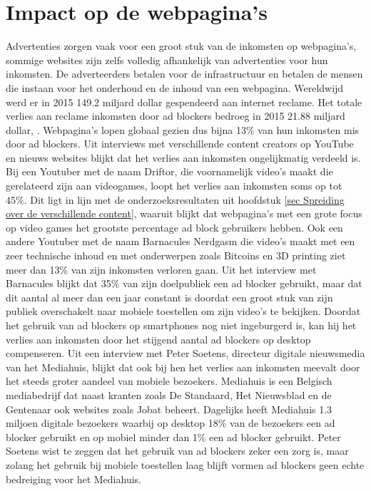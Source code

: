 \documentclass[pdftex,a4paper,12pt,twoside]{report}
\begin{document}
\section{Impact op de webpagina's}
\label{sec:Impact op de webpagina's}
Advertenties zorgen vaak voor een groot stuk van de inkomsten op webpagina's, sommige websites zijn zelfs volledig afhankelijk van advertenties voor hun inkomsten. De adverteerders betalen voor de infrastructuur en betalen de mensen die instaan voor het onderhoud en de inhoud van een webpagina. Wereldwijd werd er in 2015 149.2 miljard dollar gespendeerd aan internet reclame. Het totale verlies aan reclame inkomsten door ad blockers bedroeg in 2015 21.88 miljard dollar, \cite{PageFair2015}. Webpagina's lopen globaal gezien dus bijna 13\% van hun inkomsten mis door ad blockers. Uit interviews met verschillende content creators op YouTube en nieuws websites blijkt dat het verlies aan inkomsten ongelijkmatig verdeeld is. Bij een Youtuber met de naam Driftor, die voornamelijk video's maakt die gerelateerd zijn aan videogames, loopt het verlies aan inkomsten soms op tot 45\%. Dit ligt in lijn met de onderzoeksresultaten uit hoofdstuk \ref{sec Spreiding over de verschillende content}, waaruit blijkt dat webpagina's met een grote focus op video games het grootste percentage ad block gebruikers hebben. Ook een andere Youtuber met de naam Barnacules Nerdgasm die video's maakt met een zeer technische inhoud en met onderwerpen zoals Bitcoins en 3D printing ziet meer dan 13\% van zijn inkomsten verloren gaan. Uit het interview met Barnacules blijkt dat 35\% van zijn doelpubliek een ad blocker gebruikt, maar dat dit aantal al meer dan een jaar constant is doordat een groot stuk van zijn publiek overschakelt naar mobiele toestellen om zijn video's te bekijken. Doordat het gebruik van ad blockers op smartphones nog niet ingeburgerd is, kan hij het verlies aan inkomsten door het stijgend aantal ad blockers op desktop compenseren.
Uit een interview met Peter Soetens, directeur digitale nieuwsmedia van het Mediahuis, blijkt dat ook bij hen het verlies aan inkomsten meevalt door het steeds groter aandeel van mobiele bezoekers. Mediahuis is een Belgisch mediabedrijf dat naast kranten zoals De Standaard, Het Nieuwsblad en de Gentenaar ook websites zoals Jobat beheert. Dagelijks heeft Mediahuis 1.3 miljoen digitale bezoekers waarbij op desktop 18\% van de bezoekers een ad blocker gebruikt en op mobiel minder dan 1\% een ad blocker gebruikt. Peter Soetens wist te zeggen dat het gebruik van ad blockers zeker een zorg is, maar zolang het gebruik bij mobiele toestellen laag blijft vormen ad blockers geen echte bedreiging voor het Mediahuis.
\end{document}
